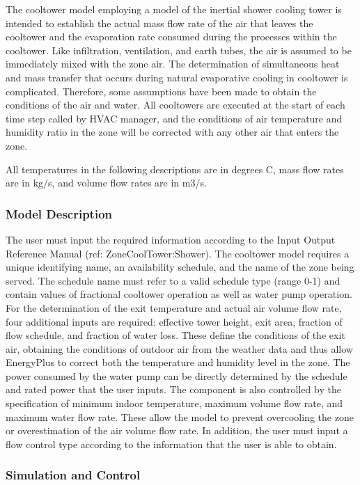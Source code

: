 The cooltower model employing a model of the inertial shower cooling tower is intended to establish the actual mass flow rate of the air that leaves the cooltower and the evaporation rate consumed during the processes within the cooltower. Like infiltration, ventilation, and earth tubes, the air is assumed to be immediately mixed with the zone air. The determination of simultaneous heat and mass transfer that occurs during natural evaporative cooling in cooltower is complicated. Therefore, some assumptions have been made to obtain the conditions of the air and water. All cooltowers are executed at the start of each time step called by HVAC manager, and the conditions of air temperature and humidity ratio in the zone will be corrected with any other air that enters the zone.

All temperatures in the following descriptions are in degrees C, mass flow rates are in kg/s, and volume flow rates are in m3/s.

\subsubsection{Model Description}\label{model-description-5-000}

The user must input the required information according to the Input Output Reference Manual (ref: ZoneCoolTower:Shower). The cooltower model requires a unique identifying name, an availability schedule, and the name of the zone being served. The schedule name must refer to a valid schedule type (range 0-1) and contain values of fractional cooltower operation as well as water pump operation. For the determination of the exit temperature and actual air volume flow rate, four additional inputs are required: effective tower height, exit area, fraction of flow schedule, and fraction of water loss. These define the conditions of the exit air, obtaining the conditions of outdoor air from the weather data and thus allow EnergyPlus to correct both the temperature and humidity level in the zone. The power consumed by the water pump can be directly determined by the schedule and rated power that the user inputs. The component is also controlled by the specification of minimum indoor temperature, maximum volume flow rate, and maximum water flow rate. These allow the model to prevent overcooling the zone or overestimation of the air volume flow rate. In addition, the user must input a flow control type according to the information that the user is able to obtain.

\subsubsection{Simulation and Control}\label{simulation-and-control-5-000}

